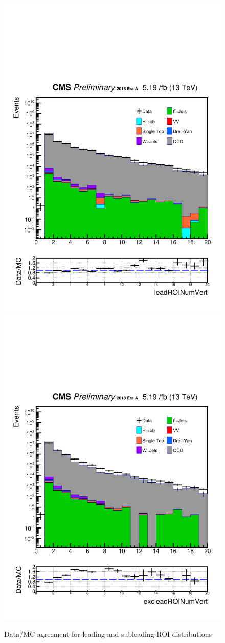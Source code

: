 \begin{figure}[h!]
  \caption{Data/MC agreement for leading and subleading ROI distributions}
  \label{fig:DataMCscore3}
  \centering
  \includegraphics[width=0.57\linewidth]{figs/Data_log_Oct6ANVars_MS-15_ctauS-10_leadROINumVert.pdf}
  \includegraphics[width=0.57\linewidth]{figs/Data_log_Oct6ANVars_MS-15_ctauS-10_excleadROINumVert.pdf}
\end{figure}


